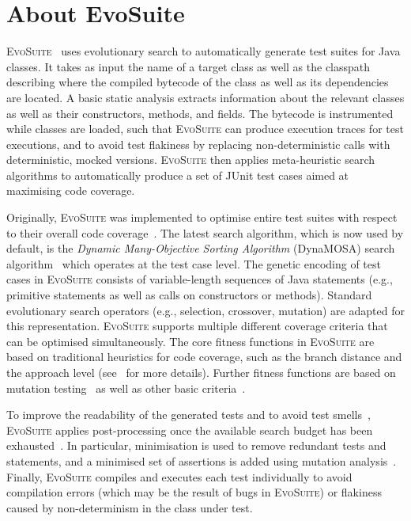 \documentclass[sigconf,review,anonymous]{acmart}
\newcommand{\EVOSUITE}{\textsc{EvoSuite}\xspace}
\begin{document}
\section{About EvoSuite}


\EVOSUITE~\cite{FrA11c} uses evolutionary search to automatically generate test
suites for Java classes. It takes as input the name of a target class as well
as the classpath describing where the compiled bytecode of the class as well as
its dependencies are located. A basic static analysis extracts information
about the relevant classes as well as their constructors, methods, and fields.
The bytecode is instrumented while classes are loaded, such that \EVOSUITE can
produce execution traces for test executions, and to avoid test flakiness by
replacing non-deterministic calls with deterministic, mocked versions.
\EVOSUITE then applies meta-heuristic search algorithms to automatically
produce a set of JUnit test cases aimed at maximising code coverage.


Originally, \EVOSUITE was implemented to optimise entire test suites with
respect to their overall code coverage~\cite{GoA_TSE12}. The latest search algorithm, which is now used by default, is the \textit{Dynamic Many-Objective Sorting Algorithm} (DynaMOSA) search algorithm~\cite{dynamosa} which operates at the test case level. 
%
The genetic encoding of test cases in \EVOSUITE consists of variable-length sequences of Java statements (e.g., primitive statements as well as calls on constructors or methods). Standard evolutionary search operators (e.g., selection, crossover, mutation) are adapted for this representation. 
%
\EVOSUITE supports multiple different coverage criteria that can be optimised simultaneously. The core fitness functions in \EVOSUITE are based on traditional heuristics for code coverage, such as the branch distance and the approach level (see~\cite{GoA_TSE12} for more details). Further fitness functions are based on mutation testing~\cite{emse14_mutation} as well as other basic criteria~\cite{rojas2015combining}.


To improve the readability of the generated tests and to avoid test smells~\cite{panichella2020revisiting}, \EVOSUITE applies post-processing once the available search budget has been exhausted~\cite{FrA11c,FrA13a}. In particular, minimisation is used to remove redundant tests and statements, and a minimised set of assertions is added using mutation analysis~\cite{10.1109/TSE.2011.93}. Finally, \EVOSUITE compiles and executes each test individually to avoid compilation errors (which may be the result of bugs in \EVOSUITE) or flakiness caused by non-determinism in the class under test.
\end{document}
